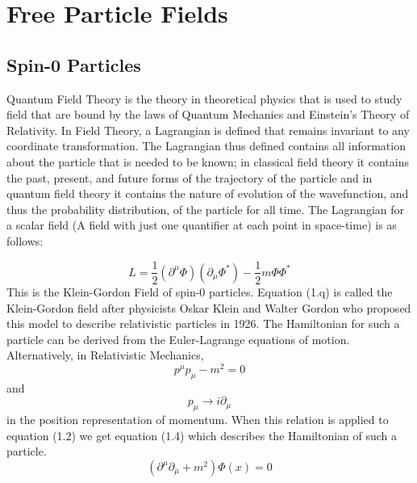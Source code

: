 
\chapter{Free Particle Fields} %

\label{Chapter1} %



\section{Spin-0 Particles}
Quantum Field Theory is the theory in theoretical physics that is used to study field that are bound by the laws of Quantum Mechanics and Einstein's Theory of Relativity. In Field Theory, a Lagrangian is defined that remains invariant to any coordinate transformation. The Lagrangian thus defined contains all information about the particle that is needed to be known; in classical field theory it contains the past, present, and future forms of the trajectory of the particle and in quantum field theory it contains the nature of evolution of the wavefunction, and thus the probability distribution, of the particle for all time. The Lagrangian for a scalar field (A field with just one quantifier at each point in space-time) is as follows:

\begin{equation}
{L} = \frac{1}{2}({\partial^{\mu}} \Phi)({\partial_{\mu}} \Phi^*) - \frac{1}{2}m\Phi\Phi^*
\end{equation}
This is the Klein-Gordon Field of spin-0 particles. Equation (1.q) is called the Klein-Gordon field after physicists Oskar Klein and Walter Gordon who proposed this model to describe relativistic particles in 1926.\cite{KGE}
The Hamiltonian for such a particle can be derived from the Euler-Lagrange equations of motion. Alternatively, in Relativistic Mechanics, \cite{lahiri04}
\begin{equation}
p^{\mu}p_{\mu}-m^2=0
\end{equation}
and
\begin{equation}
 p_{\mu} \xrightarrow{} i{\partial_{\mu}}
\end{equation}
in the position representation of momentum.
When this relation is applied to equation (1.2) we get equation (1.4) which describes the Hamiltonian of such a particle.
\begin{equation}
(\partial^{\mu}\partial_{\mu}+m^2)\Phi(x)=0
\end{equation}

